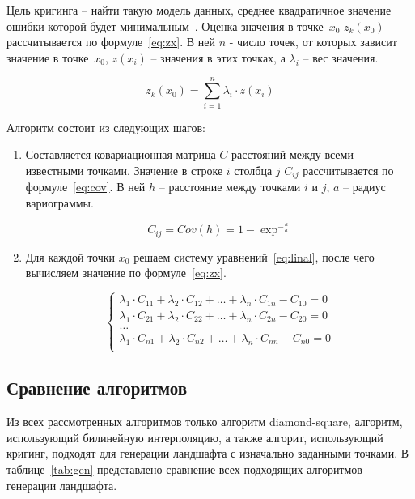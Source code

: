 Цель кригинга – найти такую модель данных, среднее квадратичное значение ошибки которой будет минимальным~\cite{criging}. Оценка значения в точке~$x_0$ $z_k(x_0)$ рассчитывается по формуле~\ref{eq:zx}. В ней $n$ - число точек, от которых зависит значение в точке~$x_0$, $z(x_i)$ -- значения в этих точках, а $\lambda_i$ -- вес значения.

\begin{equation}
	\label{eq:zx}
	z_k(x_0) = \sum_{i=1}^{n}\lambda_i \cdot z(x_i)
\end{equation}

Алгоритм состоит из следующих шагов:

\begin{enumerate}[label=\arabic*.]
	\item Составляется ковариационная матрица $C$ расстояний между всеми известными точками. Значение в строке $i$ столбца $j$ $C_{ij}$ рассчитывается по формуле~\ref{eq:cov}. В ней $h$ -- расстояние между точками $i$ и $j$, $a$ -- радиус вариограммы.
	
\begin{equation}
	\label{eq:cov}
	C_{ij} = Cov(h) = 1 - \exp^{-\frac{h}{a}}
\end{equation}
	
	\item Для каждой точки $x_0$ решаем систему уравнений~\ref{eq:linal}, после чего вычисляем значение по формуле~\ref{eq:zx}.
	
\begin{equation}
	\label{eq:linal}
	\begin{cases}
		\lambda_1 \cdot C_{11} + \lambda_2 \cdot C_{12} + \ldots + \lambda_n \cdot C_{1n} - C_{10} = 0\\
		\lambda_1 \cdot C_{21} + \lambda_2 \cdot C_{22} + \ldots + \lambda_n \cdot C_{2n} - C_{20} = 0\\
		\ldots\\
		\lambda_1 \cdot C_{n1} + \lambda_2 \cdot C_{n2} + \ldots + \lambda_n \cdot C_{nn} - C_{n0} = 0\\
	\end{cases}
\end{equation}

\end{enumerate}

\subsection{Сравнение алгоритмов}

Из всех рассмотренных алгоритмов только алгоритм diamond-square, алгоритм, использующий билинейную интерполяцию, а также алгорит, использующий кригинг, подходят для генерации ландшафта с изначально заданными точками. В таблице~\ref{tab:gen} представлено сравнение всех подходящих алгоритмов генерации ландшафта.

